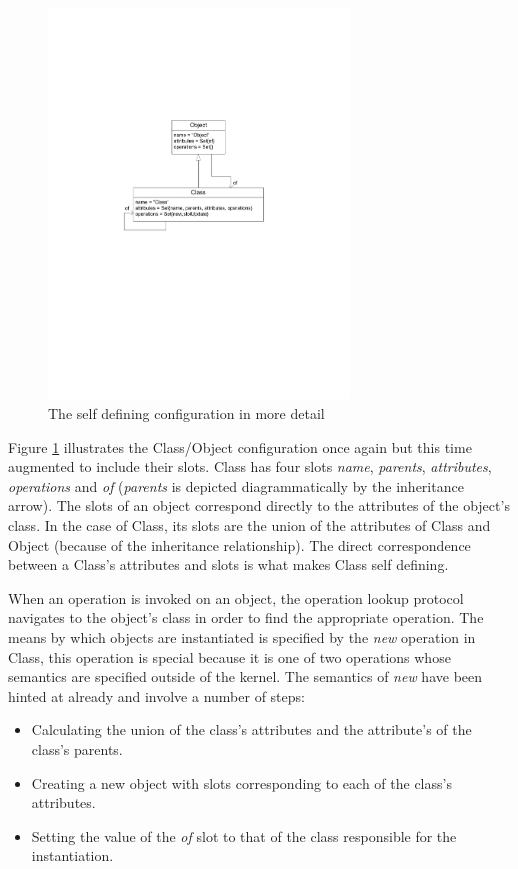 \begin{figure}[htb]
\begin{center}
\includegraphics[width=8cm]{MetaToolArchitecture/figures/moreDetail.pdf}
\caption{The self defining configuration in more detail}
\label{moreDetail}
\end{center}
\end{figure}

Figure \ref{moreDetail} illustrates the Class/Object configuration once again but this time augmented to include their slots.  Class has four slots \emph{name}, \emph{parents}, \emph{attributes}, \emph{operations} and \emph{of} (\emph{parents} is depicted diagrammatically by the inheritance arrow).  The slots of an object correspond directly to the attributes of the object's class.  In the case of Class, its slots are the union of the attributes of Class and Object (because of the inheritance relationship).  The direct correspondence between a Class's attributes and slots is what makes Class self defining.

When an operation is invoked on an object, the operation lookup protocol navigates to the object's class in order to find the appropriate operation.  The means by which objects are instantiated is specified by the \emph{new} operation in Class, this operation is special because it is one of two operations whose semantics are specified outside of the kernel.  The semantics of \emph{new} have been hinted at already and involve a number of steps:

\begin{itemize}
\item Calculating the union of the class's attributes and the attribute's of the class's parents.
\item Creating a new object with slots corresponding to each of the class's attributes.
\item Setting the value of the \emph{of} slot to that of the class responsible for the instantiation.
\end{itemize}

